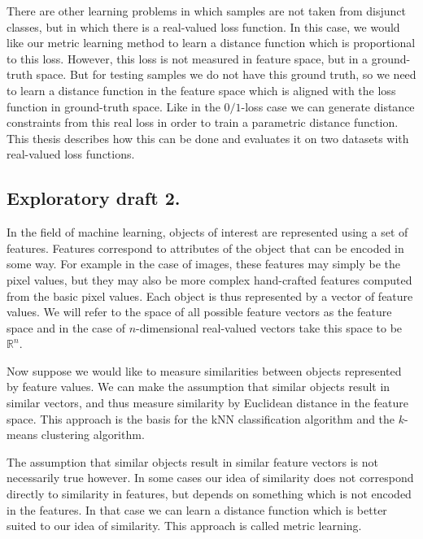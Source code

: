 There are other learning problems in which samples are not taken from disjunct classes, but in which there is a real-valued loss function. In this case, we would like our metric learning method to learn a distance function which is proportional to this loss. However, this loss is not measured in feature space, but in a ground-truth space. But for testing samples we do not have this ground truth, so we need to learn a distance function in the feature space which is aligned with the loss function in ground-truth space. Like in the $0/1$-loss case we can generate distance constraints from this real loss in order to train a parametric distance function. This thesis describes how this can be done and evaluates it on two datasets with real-valued loss functions.



\subsection*{Exploratory draft 2.}

In the field of machine learning, objects of interest are represented using a set of features. Features correspond to attributes of the object that can be encoded in some way. For example in the case of images, these features may simply be the pixel values, but they may also be more complex hand-crafted features computed from the basic pixel values. Each object is thus represented by a vector of feature values. We will refer to the space of all possible feature vectors as the feature space and in the case of $n$-dimensional real-valued vectors take this space to be $\mathbb{R}^n$.

Now suppose we would like to measure similarities between objects represented by feature values. We can make the assumption that similar objects result in similar vectors, and thus measure similarity by Euclidean distance in the feature space. This approach is the basis for the \ac{kNN} classification algorithm and the $k$-means clustering algorithm. 

The assumption that similar objects result in similar feature vectors is not necessarily true however. In some cases our idea of similarity does not correspond directly to similarity in features, but depends on something which is not encoded in the features. In that case we can learn a distance function which is better suited to our idea of similarity. This approach is called metric learning. 

